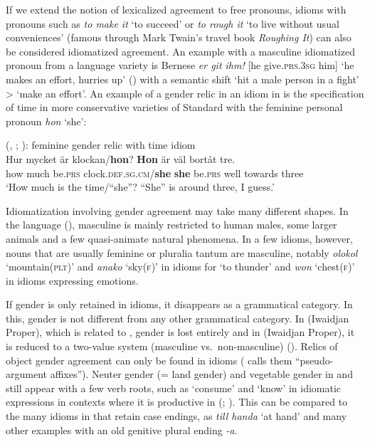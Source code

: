 \documentclass[output=collectionpaper]{langsci/langscibook}
\begin{document}
If we extend the notion of lexicalized agreement to free pronouns, idioms with pronouns such as  \textit{to make it} `to succeed' or \textit{to rough it} `to live without usual conveniences' (famous through Mark Twain's travel book \textit{Roughing It}) can also be considered idiomatized agreement. An example with a masculine idiomatized pronoun from a  language variety is Bernese  \textit{er git ihm!} [he give.\textsc{prs.3sg} him] `he makes an effort, hurries up' (\citealt[125]{Greyerz1997}) with a semantic shift `hit a male person in a fight' > `make an effort'. An example of a gender relic in an idiom in  is the specification of time in more conservative varieties of Standard  with the feminine personal pronoun \textit{hon} `she':

\ea\label{ex:WDG:74}
 (, ; \citealt[276]{Teleman1999}): feminine gender relic with time idiom\\
\gll Hur	mycket	är	klockan/\textbf{hon}?	\textendash{}	\textbf{Hon}	är	väl	bortåt	tre.\\
how	much	be.\textsc{prs}	clock.\textsc{def.sg.cm}/\textbf{she}	{} \textbf{she}	be.\textsc{prs}	well	towards	three\\
\glt `How much is the time/``she''? \textendash ``She'' is around three, I guess.'\\
\z

Idiomatization involving gender agreement may take many different shapes. In the  language  (), masculine is mainly restricted to human males, some larger animals and a few quasi-animate natural phenomena. In a few idioms, however, nouns that are usually feminine or pluralia tantum are masculine, notably \textit{olokol} `mountain(\textsc{plt})' and \textit{anako} `sky(\textsc{f})' in idioms for `to thunder' and \textit{won} `chest(\textsc{f})' in idioms expressing emotions.

\largerpage
If gender is only retained in idioms, it disappears as a grammatical category. In this, gender is not different from any other grammatical category. In  (Iwaidjan Proper), which is related to , gender is lost entirely and in  (Iwaidjan Proper), it is reduced to a two-value system (masculine vs.\ non-masculine) (\citealt[115]{Evans2000}). Relics of object gender agreement can only be found in idioms (\citealt{Evans2000} calls them ``pseudo-argument affixes''). Neuter gender (= land gender) and vegetable gender in  and  still appear with a few verb roots, such as `consume' and `know' in idiomatic expressions in contexts where it is productive in  (\citealt[116]{Evans2000}; \citealt[643]{Singer2011}). This can be compared to the many idioms in  that retain case endings, as \textit{till handa} `at hand' and many other examples with an old genitive plural ending \textit{-a}.
\end{document}
